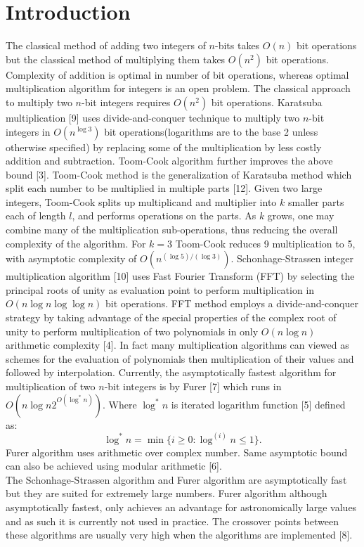 \documentclass[conference]{IEEEtran}
\begin{document}
\section{Introduction}
The classical method of adding two integers of $n$-bits takes $O(n)$ bit operations but the classical method of multiplying them takes $O(n^{2})$ bit operations. Complexity of addition is optimal in number of bit operations, whereas optimal multiplication algorithm for integers is an open problem. The classical approach to multiply two $n$-bit integers requires $O(n^{2})$ bit operations. Karatsuba multiplication [9] uses divide-and-conquer technique to multiply two $n$-bit integers in $O(n^{\log 3})$ bit operations(logarithms are to the base 2 unless otherwise specified) by replacing some of the multiplication by less costly addition and subtraction. Toom-Cook algorithm further improves the above bound [3]. Toom-Cook method is the generalization of Karatsuba method which split each number to be multiplied in multiple parts [12]. Given two large integers, Toom-Cook splits up multiplicand and multiplier into $k$ smaller parts each of length $l$, and performs operations on the parts. As $k$ grows, one may combine many of the multiplication sub-operations, thus reducing the overall complexity of the algorithm. For $k=3$ Toom-Cook reduces 9 multiplication to 5, with 
asymptotic complexity of $O(n^{(\log 5)/(\log 3)})$. Schonhage-Strassen integer multiplication algorithm [10] uses Fast Fourier Transform (FFT) by selecting the principal roots of unity as evaluation point to perform multiplication in $O(n \log n \log\log n)$ bit operations. FFT method employs a divide-and-conquer strategy by taking advantage of the special properties of the complex root of unity to perform multiplication of two polynomials in only $O(n \log n)$ arithmetic complexity [4]. In fact many multiplication algorithms can viewed as schemes for the evaluation of polynomials then multiplication of their values and followed by interpolation. Currently, the asymptotically fastest algorithm for multiplication of two $n$-bit integers is by Furer [7] which runs in $O(n \log n 2^{O(\log^* n)})$. Where $\log^* n$ is iterated logarithm function [5] defined as: $$\log^* n=\min\{i\geq 0 : \log^{(i)}n \leq 1\} .$$
Furer algorithm uses arithmetic over complex number. Same asymptotic bound can also be achieved using modular arithmetic [6].\\
\indent The Schonhage-Strassen algorithm and Furer algorithm are asymptotically fast but they are suited for extremely large numbers. Furer algorithm although asymptotically fastest, only achieves an advantage for astronomically large values and as such it is currently not used in practice. The crossover points between these algorithms are usually very high when the algorithms are implemented [8].
\end{document}
